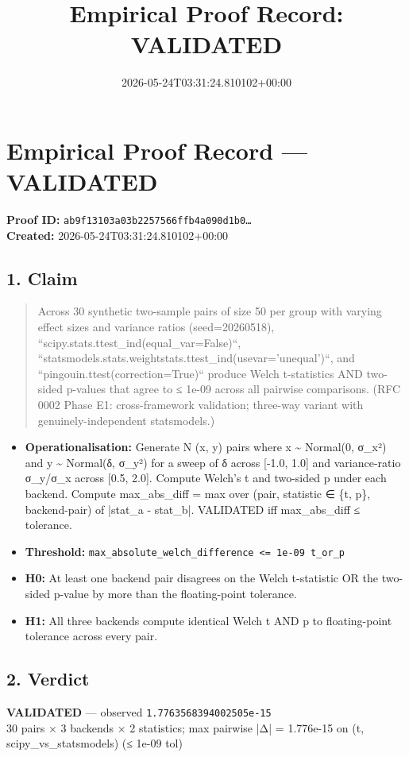 \documentclass{article}
\title{Empirical Proof Record: VALIDATED}
\date{2026-05-24T03:31:24.810102+00:00}
\begin{document}
\maketitle
\section*{Empirical Proof Record --- \textcolor{validated}{\textbf{VALIDATED}}}
\textbf{Proof ID:} \texttt{ab9f13103a03b2257566ffb4a090d1b0\dots}\\
\textbf{Created:} 2026-05-24T03:31:24.810102+00:00
\subsection*{1. Claim}
\begin{quote}Across 30 synthetic two-sample pairs of size 50 per group with varying effect sizes and variance ratios (seed=20260518), ``scipy.stats.ttest\_ind(equal\_var=False)``, ``statsmodels.stats.weightstats.ttest\_ind(usevar='unequal')``, and ``pingouin.ttest(correction=True)`` produce Welch t-statistics AND two-sided p-values that agree to ≤ 1e-09 across all pairwise comparisons. (RFC 0002 Phase E1: cross-framework validation; three-way variant with genuinely-independent statsmodels.)\end{quote}
\begin{itemize}
\item \textbf{Operationalisation:} Generate N (x, y) pairs where x \textasciitilde{} Normal(0, σ\_x²) and y \textasciitilde{} Normal(δ, σ\_y²) for a sweep of δ across [-1.0, 1.0] and variance-ratio σ\_y/σ\_x across [0.5, 2.0]. Compute Welch's t and two-sided p under each backend. Compute max\_abs\_diff = max over (pair, statistic ∈ \{t, p\}, backend-pair) of |stat\_a - stat\_b|. VALIDATED iff max\_abs\_diff ≤ tolerance.
\item \textbf{Threshold:} \texttt{max\_absolute\_welch\_difference <= 1e-09 t\_or\_p}
\item \textbf{H0:} At least one backend pair disagrees on the Welch t-statistic OR the two-sided p-value by more than the floating-point tolerance.
\item \textbf{H1:} All three backends compute identical Welch t AND p to floating-point tolerance across every pair.
\end{itemize}
\subsection*{2. Verdict}
\textcolor{validated}{\textbf{VALIDATED}} --- observed \texttt{1.7763568394002505e-15}\\
30 pairs × 3 backends × 2 statistics; max pairwise |Δ| = 1.776e-15 on (t, scipy\_vs\_statsmodels) (≤ 1e-09 tol)
\end{document}
